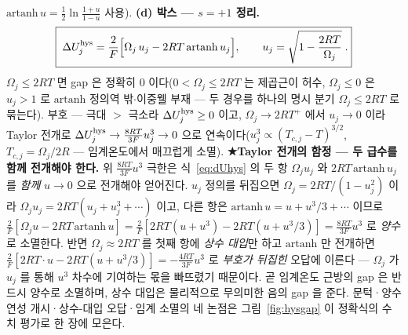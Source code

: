 $\mathrm{artanh}\,u=\tfrac12\ln\tfrac{1+u}{1-u}$ 사용). \textbf{(d) 박스 --- $s=+1$ 정리.}
\begin{equation}
\boxed{\;\Delta U_j^{\mathrm{hys}}
=\frac{2}{F}\Big[\Omega_j\,u_j-2RT\,\mathrm{artanh}\,u_j\Big],
\qquad u_j=\sqrt{1-\frac{2RT}{\Omega_j}}\;.}
\label{eq:dUhys}
\end{equation}
$\Omega_j\le2RT$ 면 gap 은
정확히 $0$ 이다($0<\Omega_j\le2RT$ 는 제곱근이 허수, $\Omega_j\le0$ 은 $u_j>1$ 로 $\mathrm{artanh}$ 정의역 밖$\cdot$이중웰 부재
--- 두 경우를 하나의 명시 분기 $\Omega_j\le2RT$ 로 묶는다). 부호 --- 극대 $>$ 극소라 $\Delta U_j^{\mathrm{hys}}\ge0$ 이고, $\Omega_j\to2RT^+$ 에서
$u_j\to0$ 이라 Taylor 전개로 $\Delta U_j^{\mathrm{hys}}\to\frac{8RT}{3F}u_j^3\to0$ 으로
연속이다($u_j^3\propto(T_{c,j}-T)^{3/2}$, $T_{c,j}=\Omega_j/2R$ --- 임계온도에서 매끄럽게 소멸). \textbf{★Taylor 전개의 함정
--- 두 급수를 함께 전개해야 한다.} 위 $\frac{8RT}{3F}u^3$ 극한은 식~\eqref{eq:dUhys} 의 두 항 $\Omega_ju_j$ 와
$2RT\,\mathrm{artanh}\,u_j$ 를 \emph{함께} $u\to0$ 으로 전개해야 얻어진다. $u_j$ 정의를 뒤집으면
$\Omega_j=2RT/(1-u_j^2)$ 이라 $\Omega_ju_j=2RT(u_j+u_j^3+\cdots)$ 이고, 다른 항은 $\mathrm{artanh}\,u=u+u^3/3+\cdots$ 이므로
$\frac{2}{F}[\Omega_ju-2RT\,\mathrm{artanh}\,u]=\frac{2}{F}[2RT(u+u^3)-2RT(u+u^3/3)]=\frac{8RT}{3F}u^3$ 로 \emph{양수}로 소멸한다.
반면 $\Omega_j\approx2RT$ 를 첫째 항에 \emph{상수 대입}만 하고 $\mathrm{artanh}$ 만 전개하면
$\frac{2}{F}[2RT\cdot u-2RT(u+u^3/3)]=-\frac{4RT}{3F}u^3$ 로 \emph{부호가 뒤집힌} 오답에 이른다 --- $\Omega_j$ 가
$u_j$ 를 통해 $u^3$ 차수에 기여하는 몫을 빠뜨렸기 때문이다. 곧 임계온도 근방의 gap 은 반드시 양수로 소멸하며,
상수 대입은 물리적으로 무의미한 음의 gap 을 준다. 문턱·양수 연성 개시·상수-대입 오답·임계 소멸의 네 논점은
그림~\ref{fig:hysgap} 이 정확식의 수치 평가로 한 장에 모은다.

